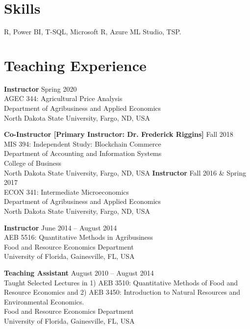 \documentclass[margin,line]{res}
\begin{document}
\begin{resume}


\section{\sc Skills}
R, Power BI, T-SQL, Microsoft R, Azure ML Studio, TSP. %

\section{\sc Teaching Experience}
{\bf Instructor } \hfill{Spring 2020} \\
AGEC 344: Agricultural Price Analysis \\
Department of Agribusiness and Applied Economics \\
North Dakota State University, Fargo, ND, USA

{\bf Co-Instructor [Primary Instructor: Dr. Frederick Riggins]} \hfill{Fall 2018} \\
MIS 394: Independent Study: Blockchain Commerce \\
Department of Accounting and Information Systems \\
College of Business \\
North Dakota State University, Fargo, ND, USA
\newpage
{\bf Instructor} \hfill{Fall 2016 \& Spring 2017} \\
ECON 341: Intermediate Microeconomics \\
Department of Agribusiness and Applied Economics \\
North Dakota State University, Fargo, ND, USA

{\bf Instructor} \hfill{June 2014 -- August 2014} \\
AEB 5516: Quantitative Methods in Agribusiness \\
Food and Resource Economics Department \\
University of Florida, Gainesville, FL, USA 

{\bf Teaching Assistant} \hfill{August 2010 -- August 2014} \\
Taught Selected Lectures in 1) AEB 3510: Quantitative Methods of Food and Resource Economics and 2) AEB 3450: Introduction to Natural Resources and Environmental Economics.\\
Food and Resource Economics Department \\
University of Florida, Gainesville, FL, USA 

\end{resume}
\end{document}
